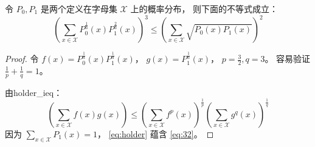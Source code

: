 \begin{lemma}\label{lem:p0p1}
    令 $P_0,P_1$ 
    是两个定义在字母集
    $\mathcal{X}$ 上的概率分布，
    则下面的不等式成立：
    \begin{equation}\label{eq:32}
        \left(\sum_{x\in \mathcal{X}}
        P^{\frac{1}{3}}_0(x)
        P^{\frac{2}{3}}_1(x)\right)^3
        \leq \left(\sum_{x\in \mathcal{X}}
        \sqrt{P_0(x) P_1(x)}\right)^2
    \end{equation}
\end{lemma}

\begin{proof}
    令 $f(x)=P^{\frac{1}{3}}_0(x)
    P^{\frac{1}{3}}_1(x)$，
    $g(x) = P^{\frac{1}{3}}_1(x)$，
    $p=\frac{3}{2}, q=3$。
    容易验证 $\frac{1}{p} + \frac{1}{q}=1$。

    由\gls{holder_ieq}：
    \begin{equation}\label{eq:holder}
        \left(\sum_{x\in\mathcal{X}}f(x)g(x) \right)
        \leq \left(\sum_{x\in\mathcal{X}} f^p(x) \right)^{\frac{1}{p}}
        \left(\sum_{x\in\mathcal{X}} g^q(x) \right)^{\frac{1}{q}}
    \end{equation}
    因为 $\sum_{x\in\mathcal{X}} P_1(x)=1$， \eqref{eq:holder} 蕴含
    \eqref{eq:32}。
\end{proof}
    
